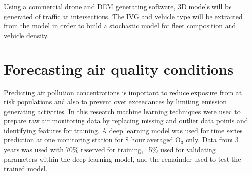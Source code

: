 Using a commercial drone and DEM generating software, 3D models will be generated of traffic at intersections. The IVG and vehicle type will be extracted from the model in order to build a stochastic model for fleet composition and vehicle density. 

\section{Forecasting air quality conditions}

Predicting air pollution concentrations is important to reduce exposure from at risk populations and also to prevent over exceedances by limiting emission generating activities. In this research machine learning techniques were used to prepare raw air monitoring data by replacing missing and outlier data points and identifying features for training. A deep learning model was used for time series prediction at one monitoring station for 8 hour averaged O$_{3}$ only.  Data from 3 years was used with 70\% reserved for training, 15\% used for validating parameters within the deep learning model, and the remainder used to test the trained model.

